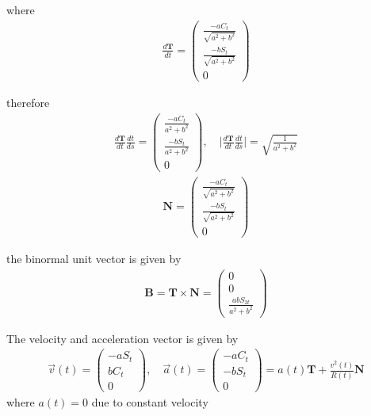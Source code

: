 \documentclass[11pt,a4paper]{article}
\begin{document}
\begin{enumerate}
where
\begin{align}
\frac{d\mathbf{T}}{dt}
=
\begin{pmatrix}
\frac{-a C_t}{\sqrt{a^2+b^2}} \\
\frac{-b S_t}{\sqrt{a^2+b^2}} \\
0
\end{pmatrix}
\end{align}

therefore
\begin{align}
\frac{d\mathbf{T}}{dt}\frac{dt}{ds}
=
\begin{pmatrix}
\frac{-a C_t}{a^2+b^2} \\
\frac{-b S_t}{a^2+b^2} \\
0
\end{pmatrix},
\hspace{1em}
\big|\frac{d\mathbf{T}}{dt}\frac{dt}{ds}\big|=
\sqrt{\frac{1}{a^2+b^2}}
\end{align}
\begin{align}
\mathbf{N}=
\begin{pmatrix}
\frac{-a C_t}{\sqrt{a^2+b^2}} \\
\frac{-b S_t}{\sqrt{a^2+b^2}} \\
0
\end{pmatrix}
\end{align}

the binormal  unit vector is given by
\begin{align}
\mathbf{B}=\mathbf{T}\times\mathbf{N}=
\begin{pmatrix}
0 \\
0 \\
\frac{ab S_{2t}}{a^2+b^2}
\end{pmatrix}
\end{align}

\newpage

The velocity and acceleration vector is given by
\begin{align}
\vec{v}(t)=
\begin{pmatrix}
-a S_t \\
b C_t \\
0
\end{pmatrix}
,\hspace{1em}
\vec{a}(t)=
\begin{pmatrix}
-a C_t \\
-b S_t \\
0
\end{pmatrix}
=a(t)\mathbf{T}+\frac{v^2(t)}{R(t)}\mathbf{N}
\end{align}
where $a(t)=0$ due to constant velocity


\end{enumerate}
\end{document}
